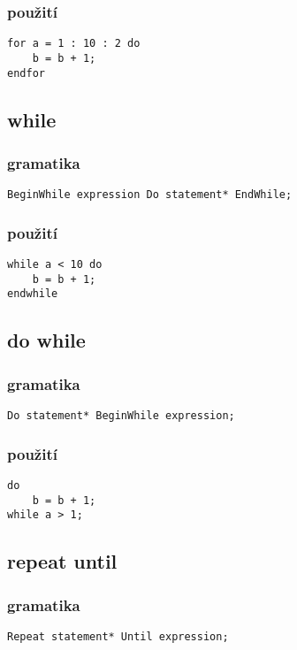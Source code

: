 \documentclass{style}
\begin{document}
\subsubsection{použití}
\begin{lstlisting}
for a = 1 : 10 : 2 do
	b = b + 1;
endfor
\end{lstlisting}

\subsection{while}
\subsubsection{gramatika}
\begin{lstlisting}
BeginWhile expression Do statement* EndWhile;
\end{lstlisting}

\subsubsection{použití}
\begin{lstlisting}
while a < 10 do
	b = b + 1;
endwhile
\end{lstlisting}

\subsection{do while}
\subsubsection{gramatika}
\begin{lstlisting}
Do statement* BeginWhile expression;
\end{lstlisting}

\subsubsection{použití}
\begin{lstlisting}
do 
	b = b + 1;
while a > 1;
\end{lstlisting}

\subsection{repeat until}
\subsubsection{gramatika}
\begin{lstlisting}
Repeat statement* Until expression;
\end{lstlisting}
\end{document}
